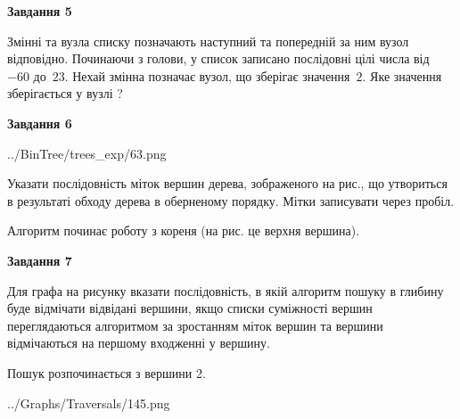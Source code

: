 \documentclass[12pt, ukrainian]{article}
\begin{document}
{\begin {large}
{\begin {center}\textbf{Завдання 5}\end {center}}\par
Змінні  та  вузла списку позначають наступний та попередній за ним вузол відповідно. Починаючи з голови, у список записано послідовні цілі числа від~$-60$ до~$23$. Нехай змінна  позначає вузол, що зберігає значення~$2$.
Яке значення зберігається у вузлі  ?\par
\newpage

{\begin {center}\textbf{Завдання 6}\end {center}}\par

\begin{center}
	{../BinTree/trees_exp/63.png}
\end{center}
Указати послідовність міток вершин дерева, зображеного на рис., що утвориться в результаті обходу дерева в оберненому порядку. Мітки записувати через пробіл.\par Алгоритм починає роботу з кореня (на рис. це верхня вершина).\par
\newpage

{\begin {center}\textbf{Завдання 7}\end {center}}\par
Для графа на рисунку вказати послідовність, в якій алгоритм пошуку в глибину буде відмічати відвідані вершини, якщо списки суміжності вершин переглядаються алгоритмом за зростанням міток вершин та вершини відмічаються на першому вход\-женні у вершину.\par
Пошук розпочинається з вершини 2.\par

\begin{center}
	{../Graphs/Traversals/145.png}
\end{center}\par
\newpage


\end{large}}
\end{document}
